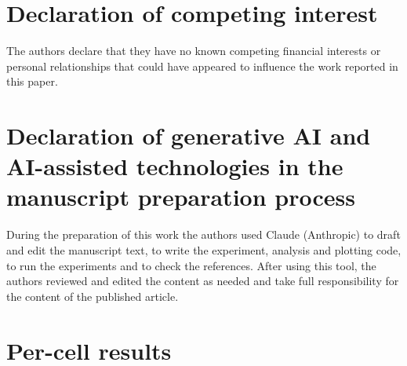 \documentclass[preprint,12pt,times]{elsarticle}
\begin{document}
\section*{Declaration of competing interest}
The authors declare that they have no known competing financial interests or personal relationships that could have appeared to influence the work reported in this paper.

\section*{Declaration of generative AI and AI-assisted technologies in the manuscript preparation process}
During the preparation of this work the authors used Claude (Anthropic) to draft and edit the manuscript text, to write the experiment, analysis and plotting code, to run the experiments and to check the references.
After using this tool, the authors reviewed and edited the content as needed and take full responsibility for the content of the published article.

\appendix
\section{Per-cell results}
\label{app:cells}
\begin{table}[!htbp]
\centering
\caption{Study~1 test accuracy (\%, mean of seeds 101 to 105) per cell, ordered by density. Best QM arm: the QM-family arm selected on validation. $\Delta_{\mathrm{R1}}$ = TMR $-$ TM. $\Delta_{\mathrm{QM}}$ = QM $-$ TM. $\Delta_{\mathrm{best}}$ = best QM arm $-$ best non-QM arm (best non-QM arm not shown). Bold: significant after Holm correction over 48 cells.}
\label{tab:study1}
\scriptsize
\renewcommand{\arraystretch}{0.92}

\end{table}



\end{document}
